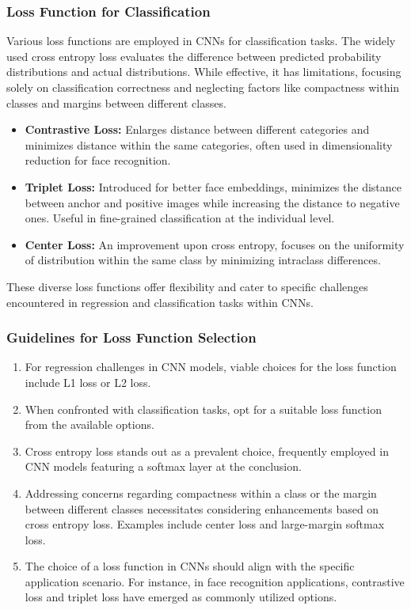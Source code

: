\subsubsection{Loss Function for Classification}
Various loss functions are employed in CNNs for classification tasks. The widely used cross entropy loss evaluates the difference between predicted probability distributions and actual distributions. While effective, it has limitations, focusing solely on classification correctness and neglecting factors like compactness within classes and margins between different classes.

\begin{itemize}
	\item \textbf{Contrastive Loss:}
	Enlarges distance between different categories and minimizes distance within the same categories, often used in dimensionality reduction for face recognition.
	
	\item \textbf{Triplet Loss:}
	Introduced for better face embeddings, minimizes the distance between anchor and positive images while increasing the distance to negative ones. Useful in fine-grained classification at the individual level.
	
	\item \textbf{Center Loss:}
	An improvement upon cross entropy, focuses on the uniformity of distribution within the same class by minimizing intraclass differences.
\end{itemize}

These diverse loss functions offer flexibility and cater to specific challenges encountered in regression and classification tasks within CNNs.

\subsubsection{Guidelines for Loss Function Selection}

\begin{enumerate}
	\item For regression challenges in CNN models, viable choices for the loss function include L1 loss or L2 loss.
	
	\item When confronted with classification tasks, opt for a suitable loss function from the available options.
	
	\item Cross entropy loss stands out as a prevalent choice, frequently employed in CNN models featuring a softmax layer at the conclusion.
	
	\item Addressing concerns regarding compactness within a class or the margin between different classes necessitates considering enhancements based on cross entropy loss. Examples include center loss and large-margin softmax loss.
	
	\item The choice of a loss function in CNNs should align with the specific application scenario. For instance, in face recognition applications, contrastive loss and triplet loss have emerged as commonly utilized options.
\end{enumerate}

